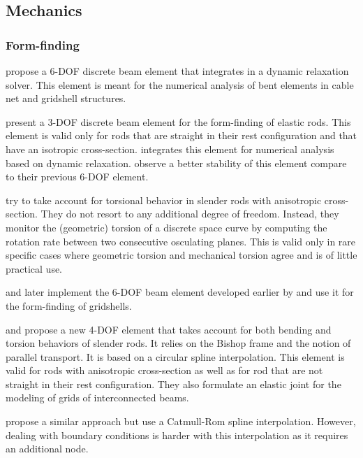 \subsection{Mechanics}

\subsubsection{Form-finding}

 propose a 6-DOF discrete beam element that integrates in a dynamic relaxation solver. This element is meant for the numerical analysis of bent elements in cable net and gridshell structures.

 present a 3-DOF discrete beam element for the form-finding of elastic rods. This element is valid only for rods that are straight in their rest configuration and that have an isotropic cross-section.  integrates this element for numerical analysis based on dynamic relaxation.  observe a better stability of this element compare to their previous 6-DOF element.

 try to take account for torsional behavior in slender rods with anisotropic cross-section. They do not resort to any additional degree of freedom. Instead, they monitor the (geometric) torsion of a discrete space curve by computing the rotation rate between two consecutive osculating planes. This is valid only in rare specific cases where geometric torsion and mechanical torsion agree and is of little practical use.

 and later  implement the 6-DOF beam element developed earlier by  and use it for the form-finding of gridshells.

 and  propose a new 4-DOF element that takes account for both bending and torsion behaviors of slender rods. It relies on the Bishop frame and the notion of parallel transport. It is based on a circular spline interpolation. This element is valid for rods with anisotropic cross-section as well as for rod that are not straight in their rest configuration. They also formulate an elastic joint for the modeling of grids of interconnected beams.

 propose a similar approach but use a Catmull-Rom spline interpolation. However, dealing with boundary conditions is harder with this interpolation as it requires an additional node.

